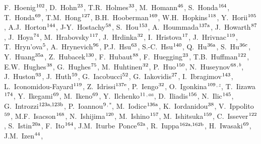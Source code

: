 \begin{flushleft}
F.~Hoenig$^\textrm{\scriptsize 102}$,
D.~Hohn$^\textrm{\scriptsize 23}$,
T.R.~Holmes$^\textrm{\scriptsize 33}$,
M.~Homann$^\textrm{\scriptsize 46}$,
S.~Honda$^\textrm{\scriptsize 164}$,
T.~Honda$^\textrm{\scriptsize 69}$,
T.M.~Hong$^\textrm{\scriptsize 127}$,
B.H.~Hooberman$^\textrm{\scriptsize 169}$,
W.H.~Hopkins$^\textrm{\scriptsize 118}$,
Y.~Horii$^\textrm{\scriptsize 105}$,
A.J.~Horton$^\textrm{\scriptsize 144}$,
J-Y.~Hostachy$^\textrm{\scriptsize 58}$,
S.~Hou$^\textrm{\scriptsize 153}$,
A.~Hoummada$^\textrm{\scriptsize 137a}$,
J.~Howarth$^\textrm{\scriptsize 87}$,
J.~Hoya$^\textrm{\scriptsize 74}$,
M.~Hrabovsky$^\textrm{\scriptsize 117}$,
J.~Hrdinka$^\textrm{\scriptsize 32}$,
I.~Hristova$^\textrm{\scriptsize 17}$,
J.~Hrivnac$^\textrm{\scriptsize 119}$,
T.~Hryn'ova$^\textrm{\scriptsize 5}$,
A.~Hrynevich$^\textrm{\scriptsize 96}$,
P.J.~Hsu$^\textrm{\scriptsize 63}$,
S.-C.~Hsu$^\textrm{\scriptsize 140}$,
Q.~Hu$^\textrm{\scriptsize 36a}$,
S.~Hu$^\textrm{\scriptsize 36c}$,
Y.~Huang$^\textrm{\scriptsize 35a}$,
Z.~Hubacek$^\textrm{\scriptsize 130}$,
F.~Hubaut$^\textrm{\scriptsize 88}$,
F.~Huegging$^\textrm{\scriptsize 23}$,
T.B.~Huffman$^\textrm{\scriptsize 122}$,
E.W.~Hughes$^\textrm{\scriptsize 38}$,
G.~Hughes$^\textrm{\scriptsize 75}$,
M.~Huhtinen$^\textrm{\scriptsize 32}$,
P.~Huo$^\textrm{\scriptsize 150}$,
N.~Huseynov$^\textrm{\scriptsize 68}$$^{,b}$,
J.~Huston$^\textrm{\scriptsize 93}$,
J.~Huth$^\textrm{\scriptsize 59}$,
G.~Iacobucci$^\textrm{\scriptsize 52}$,
G.~Iakovidis$^\textrm{\scriptsize 27}$,
I.~Ibragimov$^\textrm{\scriptsize 143}$,
L.~Iconomidou-Fayard$^\textrm{\scriptsize 119}$,
Z.~Idrissi$^\textrm{\scriptsize 137e}$,
P.~Iengo$^\textrm{\scriptsize 32}$,
O.~Igonkina$^\textrm{\scriptsize 109}$$^{,z}$,
T.~Iizawa$^\textrm{\scriptsize 174}$,
Y.~Ikegami$^\textrm{\scriptsize 69}$,
M.~Ikeno$^\textrm{\scriptsize 69}$,
Y.~Ilchenko$^\textrm{\scriptsize 11}$$^{,aa}$,
D.~Iliadis$^\textrm{\scriptsize 156}$,
N.~Ilic$^\textrm{\scriptsize 145}$,
G.~Introzzi$^\textrm{\scriptsize 123a,123b}$,
P.~Ioannou$^\textrm{\scriptsize 9}$$^{,*}$,
M.~Iodice$^\textrm{\scriptsize 136a}$,
K.~Iordanidou$^\textrm{\scriptsize 38}$,
V.~Ippolito$^\textrm{\scriptsize 59}$,
M.F.~Isacson$^\textrm{\scriptsize 168}$,
N.~Ishijima$^\textrm{\scriptsize 120}$,
M.~Ishino$^\textrm{\scriptsize 157}$,
M.~Ishitsuka$^\textrm{\scriptsize 159}$,
C.~Issever$^\textrm{\scriptsize 122}$,
S.~Istin$^\textrm{\scriptsize 20a}$,
F.~Ito$^\textrm{\scriptsize 164}$,
J.M.~Iturbe~Ponce$^\textrm{\scriptsize 62a}$,
R.~Iuppa$^\textrm{\scriptsize 162a,162b}$,
H.~Iwasaki$^\textrm{\scriptsize 69}$,
J.M.~Izen$^\textrm{\scriptsize 44}$,

\end{flushleft}
